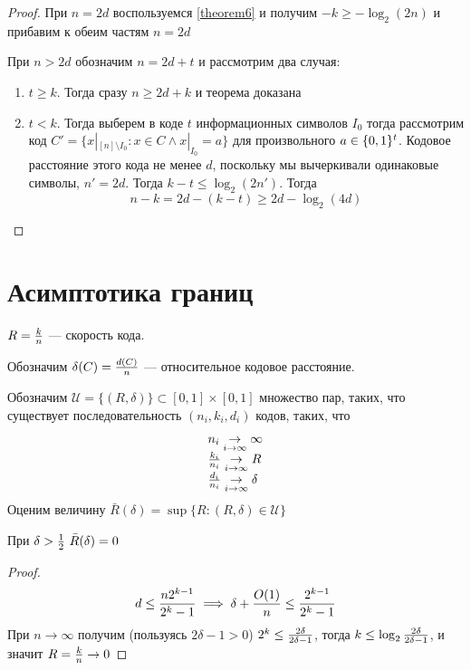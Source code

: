 \begin{proof}
При $n=2d$ воспользуемся \ref{theorem6} и получим $-k \ge -\log_2 (2n)$ и прибавим
к обеим частям $n=2d$

При $n > 2d$ обозначим $n = 2d + t$ и рассмотрим два случая:
\begin{enumerate}
\item $t \ge k$. Тогда сразу $n \ge 2d + k$ и теорема доказана
\item $t < k$. Тогда выберем в коде $t$ информационных символов
$I_0$ тогда рассмотрим код $C' = \{x|_{[n] \setminus I_0} \colon x \in C 
\land x|_{I_0} = a\}$
для произвольного $a \in \{0,1\}^t$. Кодовое расстояние
этого кода не менее $d$, поскольку мы вычеркивали одинаковые символы, $n' = 2d$.
Тогда $k-t \le \log_2 (2n')$. Тогда 
  $$n - k = 2d - (k-t) \ge 2d - \log_2 (4d)$$
\end{enumerate}
\end{proof}

\section{Асимптотика границ}

$R = {k \over n}$ --- скорость кода.

Обозначим $\delta(C) = {d(C) \over n}$ --- относительное кодовое расстояние.

Обозначим $\mathcal{U} = \{(R, \delta)\} \subset [0,1] \times [0,1]$ множество пар,
таких, что существует последовательность $(n_i, k_i, d_i)$ кодов, таких,
что $$\begin{array}{l} 
      n_i \underset{i \to \infty}{\to} \infty \\
      {k_i \over n_i} \underset{i \to \infty}{\to} R \\
      {d_i \over n_i} \underset{i \to \infty}{\to} \delta
      \end{array}$$
Оценим величину $\bar{R} (\delta) = \sup \{R \colon (R, \delta) \in \mathcal{U}\}$

\begin{remark}
При $\delta > {1 \over 2}\,\, \bar{R}(\delta) = 0$
\end{remark}
\begin{proof}
$$d \le {n 2^{k-1} \over 2^k - 1} \implies \delta + {O(1) \over n} 
    \le {2^{k-1} \over 2^k-1}$$
При $n \to \infty$ получим (пользуясь $2\delta -1 > 0$)
 $2^k \le {2 \delta \over 2 \delta - 1}$,
тогда $k \le \log_2 {2 \delta \over 2 \delta -1}$, и значит
$R = {k \over n} \to 0$
\end{proof}

